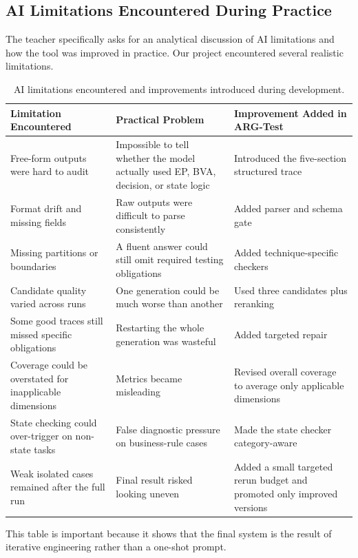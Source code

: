 \documentclass{article}
\begin{document}
\subsection{AI Limitations Encountered During Practice}
The teacher specifically asks for an analytical discussion of AI limitations and how the tool was improved in practice. Our project encountered several realistic limitations.

\begin{table}[t]
\centering
\small
\begin{tabular}{p{} p{} p{}}
\toprule
\textbf{Limitation Encountered} & \textbf{Practical Problem} & \textbf{Improvement Added in ARG-Test} \\
\midrule
Free-form outputs were hard to audit & Impossible to tell whether the model actually used EP, BVA, decision, or state logic & Introduced the five-section structured trace \\
Format drift and missing fields & Raw outputs were difficult to parse consistently & Added parser and schema gate \\
Missing partitions or boundaries & A fluent answer could still omit required testing obligations & Added technique-specific checkers \\
Candidate quality varied across runs & One generation could be much worse than another & Used three candidates plus reranking \\
Some good traces still missed specific obligations & Restarting the whole generation was wasteful & Added targeted repair \\
Coverage could be overstated for inapplicable dimensions & Metrics became misleading & Revised overall coverage to average only applicable dimensions \\
State checking could over-trigger on non-state tasks & False diagnostic pressure on business-rule cases & Made the state checker category-aware \\
Weak isolated cases remained after the full run & Final result risked looking uneven & Added a small targeted rerun budget and promoted only improved versions \\
\bottomrule
\end{tabular}
\caption{AI limitations encountered and improvements introduced during development.}
\label{tab:ailimit}
\end{table}

This table is important because it shows that the final system is the result of iterative engineering rather than a one-shot prompt.
\end{document}
